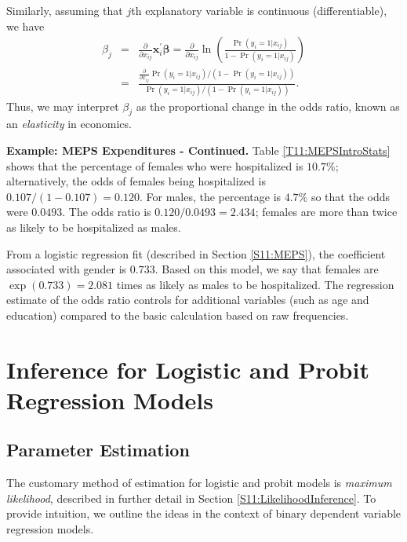 Similarly, assuming that $j$th explanatory variable is continuous
(differentiable), we have
\begin{eqnarray}\label{E11:OddsRatioElasticity}
\beta_j &=&\frac{\partial }{\partial x_{ij}}\mathbf{x}_i^{\prime}
\boldsymbol \beta =\frac{\partial }{\partial x_{ij}}\ln \left(
\frac{\Pr (y_i=1|x_{ij})}{1-\Pr (y_i=1|x_{ij})}\right)   \nonumber \\
&=&\frac{\frac{\partial }{\partial x_{ij}}\Pr (y_i=1|x_{ij})/\left(
1-\Pr (y_i=1|x_{ij})\right) }{\Pr (y_i=1|x_{ij})/\left( 1-\Pr
(y_i=1|x_{ij})\right) }.
\end{eqnarray}
Thus, we may interpret $\beta_j$ as the proportional change in the
odds ratio, known as an \emph{elasticity} in
economics.


\linejed

\textbf{Example: MEPS Expenditures - Continued.} Table
\ref{T11:MEPSIntroStats} shows that the percentage of females who
were hospitalized is $10.7\%$; alternatively, the odds of females
being hospitalized is $0.107/(1-0.107)=0.120$. For males, the
percentage is $4.7\%$ so that the odds were $0.0493$. The odds ratio
is $0.120/0.0493=2.434$; females are more than twice as likely to be
hospitalized as males.

From a logistic regression fit (described in Section
\ref{S11:MEPS}), the coefficient associated with gender is $0.733$.
Based on this model, we say that females are $\exp
(0.733)=2.081$ times as likely as males to be hospitalized. The
regression estimate of the odds ratio controls for additional
variables (such as age and education) compared to the
basic calculation based on raw frequencies.


\linejed

\section{Inference for Logistic and Probit Regression Models}

\subsection{Parameter Estimation}

The customary method of estimation for logistic and probit models is
\emph{maximum likelihood}, described in further detail in Section
\ref{S11:LikelihoodInference}. To provide intuition, we outline the
ideas in the context of binary dependent variable regression models.

